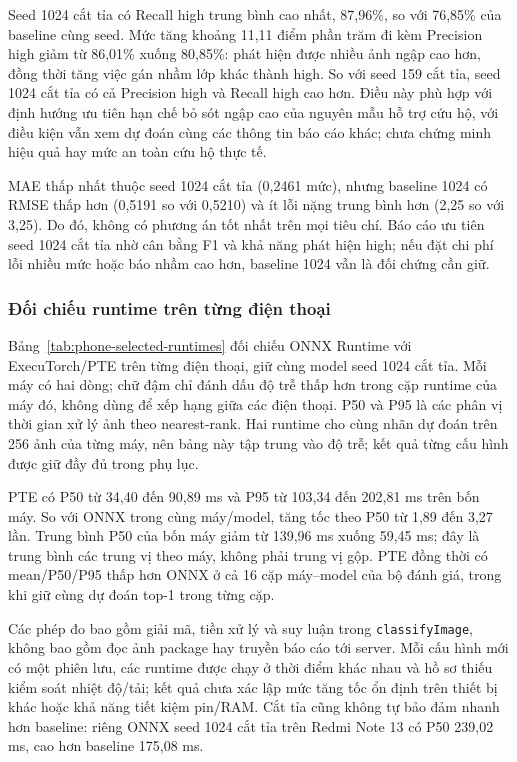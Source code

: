 

Seed 1024 cắt tỉa có Recall high trung bình cao nhất, 87,96\%, so với 76,85\% của baseline cùng seed. Mức tăng khoảng 11,11 điểm phần trăm đi kèm Precision high giảm từ 86,01\% xuống 80,85\%: phát hiện được nhiều ảnh ngập cao hơn, đồng thời tăng việc gán nhầm lớp khác thành high. So với seed 159 cắt tỉa, seed 1024 cắt tỉa có cả Precision high và Recall high cao hơn. Điều này phù hợp với định hướng ưu tiên hạn chế bỏ sót ngập cao của nguyên mẫu hỗ trợ cứu hộ, với điều kiện vẫn xem dự đoán cùng các thông tin báo cáo khác; chưa chứng minh hiệu quả hay mức an toàn cứu hộ thực tế.

MAE thấp nhất thuộc seed 1024 cắt tỉa (0,2461 mức), nhưng baseline 1024 có RMSE thấp hơn (0,5191 so với 0,5210) và ít lỗi nặng trung bình hơn (2,25 so với 3,25). Do đó, không có phương án tốt nhất trên mọi tiêu chí. Báo cáo ưu tiên seed 1024 cắt tỉa nhờ cân bằng F1 và khả năng phát hiện high; nếu đặt chi phí lỗi nhiều mức hoặc báo nhầm cao hơn, baseline 1024 vẫn là đối chứng cần giữ.

\subsubsection{Đối chiếu runtime trên từng điện thoại}
Bảng~\ref{tab:phone-selected-runtimes} đối chiếu ONNX Runtime với ExecuTorch/PTE trên từng điện thoại, giữ cùng model seed 1024 cắt tỉa. Mỗi máy có hai dòng; chữ đậm chỉ đánh dấu độ trễ thấp hơn trong cặp runtime của máy đó, không dùng để xếp hạng giữa các điện thoại. P50 và P95 là các phân vị thời gian xử lý ảnh theo nearest-rank. Hai runtime cho cùng nhãn dự đoán trên 256 ảnh của từng máy, nên bảng này tập trung vào độ trễ; kết quả từng cấu hình được giữ đầy đủ trong phụ lục.



PTE có P50 từ 34,40 đến 90,89 ms và P95 từ 103,34 đến 202,81 ms trên bốn máy. So với ONNX trong cùng máy/model, tăng tốc theo P50 từ 1,89 đến 3,27 lần. Trung bình P50 của bốn máy giảm từ 139,96 ms xuống 59,45 ms; đây là trung bình các trung vị theo máy, không phải trung vị gộp. PTE đồng thời có mean/P50/P95 thấp hơn ONNX ở cả 16 cặp máy--model của bộ đánh giá, trong khi giữ cùng dự đoán top-1 trong từng cặp.

Các phép đo bao gồm giải mã, tiền xử lý và suy luận trong \texttt{classifyImage}, không bao gồm đọc ảnh package hay truyền báo cáo tới server. Mỗi cấu hình mới có một phiên lưu, các runtime được chạy ở thời điểm khác nhau và hồ sơ thiếu kiểm soát nhiệt độ/tải; kết quả chưa xác lập mức tăng tốc ổn định trên thiết bị khác hoặc khả năng tiết kiệm pin/RAM. Cắt tỉa cũng không tự bảo đảm nhanh hơn baseline: riêng ONNX seed 1024 cắt tỉa trên Redmi Note 13 có P50 239,02 ms, cao hơn baseline 175,08 ms.

